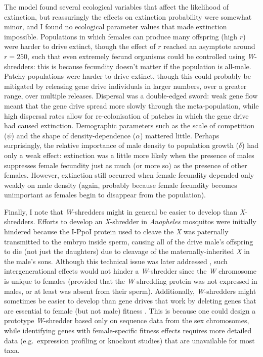 \documentclass[]{rsos}%
\begin{document}
The model found several ecological variables that affect the likelihood
of extinction, but reassuringly the effects on extinction probability
were somewhat minor, and I found no ecological parameter values that
made extinction impossible. Populations in which females can produce
many offspring (high \(r\)) were harder to drive extinct, though the
effect of \(r\) reached an asymptote around \(r = 250\), such that even
extremely fecund organisms could be controlled using \emph{W}-shredders:
this is because fecundity doesn't matter if the population is all-male.
Patchy populations were harder to drive extinct, though this could
probably be mitigated by releasing gene drive individuals in larger
numbers, over a greater range, over multiple releases. Dispersal was a
double-edged sword: weak gene flow meant that the gene drive spread more
slowly through the meta-population, while high dispersal rates allow for
re-colonisation of patches in which the gene drive had caused
extinction. Demographic parameters such as the scale of competition
(\(\psi\)) and the shape of density-dependence (\(\alpha\)) mattered
little. Perhaps surprisingly, the relative importance of male density to
population growth (\(\delta\)) had only a weak effect: extinction was a
little more likely when the presence of males suppresses female
fecundity just as much (or more so) as the presence of other females.
However, extinction still occurred when female fecundity depended only
weakly on male density (again, probably because female fecundity becomes
unimportant as females begin to disappear from the population).

Finally, I note that \emph{W}-shredders might in general be easier to
develop than \emph{X}-shredders. Efforts to develop an \emph{X}-shredder
in \emph{Anopheles} mosquitos were initially hindered because the I-PpoI
protein used to cleave the \emph{X} was paternally transmitted to the
embryo inside sperm, causing all of the drive male's offspring to die
(not just the daughters) due to cleavage of the maternally-inherited
\emph{X} in the male's sons. Although this technical issue was later
addressed \citep{galizi2014sy}, such intergenerational effects would not
hinder a \emph{W}-shredder since the \emph{W} chromosome is unique to
females (provided that the \emph{W}-shredding protein was not expressed
in males, or at least was absent from their sperm). Additionally,
\emph{W}-shredders might sometimes be easier to develop than gene drives
that work by deleting genes that are essential to female (but not male)
fitness \citep[e.g.][]{burt2018se}. This is because one could design a
prototype \emph{W}-shredder based only on sequence data from the sex
chromosomes, while identifying genes with female-specific fitness
effects requires more detailed data (e.g.~expression profiling or
knockout studies) that are unavailable for most taxa.
\end{document}
